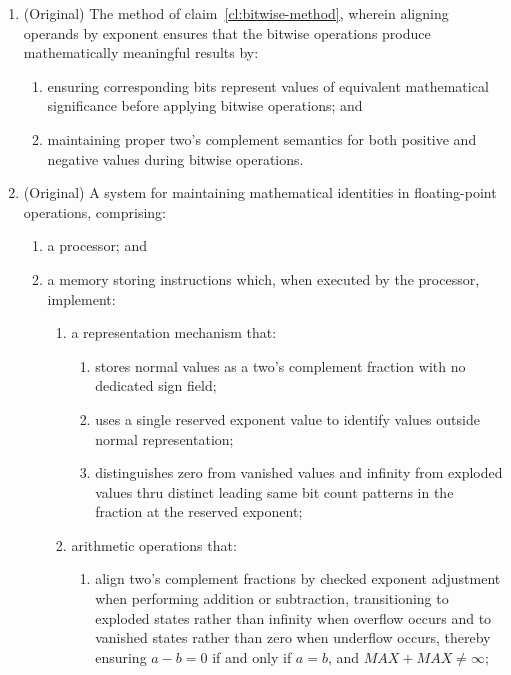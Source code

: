 \documentclass[12pt,letter]{article}
\begin{document}
\begin{enumerate}
    \item (Original) The method of claim~\ref{cl:bitwise-method}, wherein aligning operands by exponent ensures that the bitwise operations produce mathematically meaningful results by:
          \begin{enumerate}
              \item ensuring corresponding bits represent values of equivalent mathematical significance before applying bitwise operations; and
              \item maintaining proper two's complement semantics for both positive and negative values during bitwise operations.
          \end{enumerate}

    \item (Original) A system for maintaining mathematical identities in floating-point operations, comprising:
          \begin{enumerate}
              \item a processor; and
              \item a memory storing instructions which, when executed by the processor, implement:
                    \begin{enumerate}
                        \item a representation mechanism that:
                              \begin{enumerate}
                                  \item stores normal values as a two's complement fraction with no dedicated sign field;
                                  \item uses a single reserved exponent value to identify values outside normal representation;
                                  \item distinguishes zero from vanished values and infinity from exploded values thru distinct leading same bit count patterns in the fraction at the reserved exponent;
                              \end{enumerate}
                        \item arithmetic operations that:
                              \begin{enumerate}
                                  \item align two's complement fractions by checked exponent adjustment when performing addition or subtraction, transitioning to exploded states rather than infinity when overflow occurs and to vanished states rather than zero when underflow occurs, thereby ensuring $a - b = 0$ if and only if $a = b$, and $MAX + MAX \neq \infty$;

\end{enumerate}
\end{enumerate}
\end{enumerate}
\end{enumerate}
\end{document}
